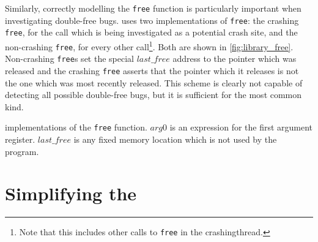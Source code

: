 Similarly, correctly modelling the \texttt{free} function is
particularly important when investigating double-free bugs.
{\Technique} uses two implementations of \texttt{free}: the crashing
\texttt{free}, for the call which is being investigated as a potential
crash site, and the non-crashing \texttt{free}, for every other
call\footnote{Note that this includes other calls to \texttt{free} in
  the \gls{crashingthread}.}\!\!.  Both are shown in
\autoref{fig:library_free}.  Non-crashing \texttt{free}s set the
special $\mathit{last\_free}$ address to the pointer which was
released and the crashing \texttt{free} asserts that the pointer which
it releases is not the one which was most recently released.  This
scheme is clearly not capable of detecting all possible double-free
bugs, but it is sufficient for the most common kind.

\begin{sanefig}
  \centerline{
  }
  \vspace{-12pt}
  \caption{{\STateMachine} implementations of the {\tt free}
    function. $\mathit{arg0}$ is an expression for the first argument
    register.  $\mathit{last\_free}$ is any fixed memory location
    which is not used by the program.}
  \label{fig:library_free}
\end{sanefig}

\section{Simplifying the {\StateMachine}}
\label{sect:derive:simplify_sm}

